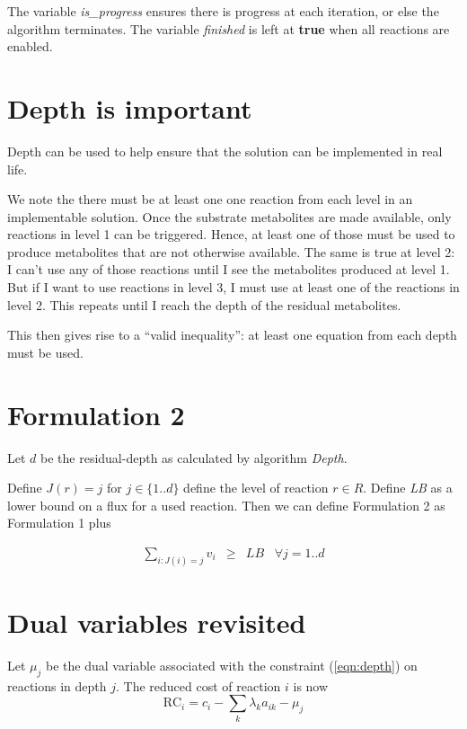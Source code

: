 \documentclass[12pt,twoside,fleqn,a4paper]{article}
\begin{document}
The variable \emph{is\_progress} ensures there is progress at each
iteration, or else the algorithm terminates. The variable
\emph{finished} is left at {\bf true} when all reactions are enabled.

\section{Depth is important}

Depth can be used to help ensure that the solution can be
implemented in real life.

We note the there must be at least one one reaction from each level in
an implementable solution. Once the substrate metabolites are made
available, only reactions in level 1 can be triggered. Hence, at least
one of those must be used to produce metabolites that are not
otherwise available. The same is true at level 2: I can't use any of
those reactions until I see the metabolites produced at level 1. But
if I want to use reactions in level 3, I must use at least one of the
reactions in level 2. This repeats until I reach the depth of the
residual metabolites.

This then gives rise to a ``valid inequality'': at least one equation
from each depth must be used.

\section{Formulation 2}

Let $d$ be the residual-depth as calculated by algorithm \emph{Depth}.

Define $J(r) = j$ for $j \in \{1 .. d\}$ define the level of reaction 
$r \in R$. Define \emph{LB} as a lower bound on a
flux for a used reaction. Then we can define Formulation 2 as
Formulation 1 plus

\begin{eqnarray}
  \sum_{i : J(i) = j} v_i & \ge & LB \;\;\; \forall j = 1..d \label{eqn:depth}
\end{eqnarray}


\section{Dual variables revisited}

Let $\mu_j$ be the dual variable associated with the constraint
(\ref{eqn:depth}) on reactions in depth $j$. The reduced cost of reaction
$i$ is now
\[
\mbox{RC}_i = c_i - \sum_k{\lambda_k a_{ik}} - \mu_j \label{eqn:rc2}
\]
\end{document}
